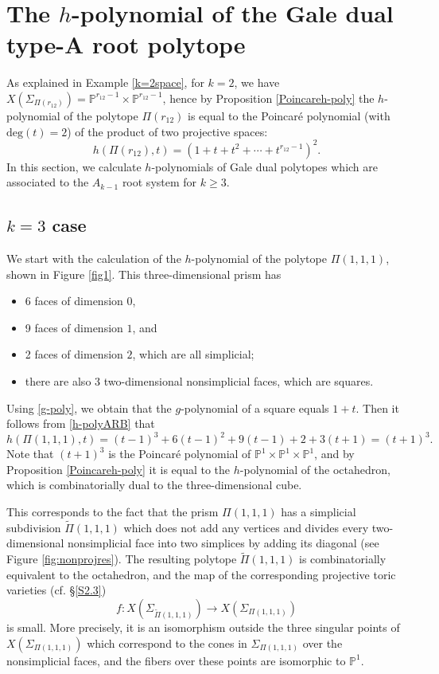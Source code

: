 \documentclass[11pt]{article}
\theoremstyle{definition}
\numberwithin{equation}{section}
\begin{document}
\section{The \texorpdfstring{$h$}{h}-polynomial of the Gale dual type-A root polytope}\label{sec:hpol}
As explained in Example \ref{k=2space}, for $k=2$, we have 
$X(\Sigma_{\Pi(r_{12})}) = \mathbb{P}^{r_{12}-1}\times\mathbb{P}^{r_{12}-1}$, 
hence by Proposition \ref{Poincareh-poly} the $h$-polynomial of the polytope 
$\Pi(r_{12})$ is equal to the Poincar\'e polynomial (with $\mathrm{deg}(t)=2$) 
of the product of two 
projective spaces:
$$h(\Pi(r_{12}), t) = (1+t+t^2+ \cdots +t^{r_{12}-1})^2.$$
In this section, we calculate $h$-polynomials of Gale dual polytopes which are associated to the $A_{k-1}$ root system for $k\geq3$.

\subsection{\texorpdfstring{$k=3$}{k=3} case}
We start with the calculation of the $h$-polynomial of the polytope 
$\Pi(1,1,1)$, shown in Figure \ref{fig1}. This three-dimensional prism 
has\begin{itemize}
	\item  6 faces of dimension $0$, 
	\item 9 faces of dimension $1$, and 
	\item 2 faces of dimension $2$, which are all simplicial;
	\item  there are also 3 two-dimensional nonsimplicial faces, which are 
	squares. 
\end{itemize}
Using  \eqref{g-poly}, we obtain that the $g$-polynomial of a square equals  
$1+t$. 
Then it follows from \eqref{h-polyARB} that
$$h(\Pi(1,1,1), t) = (t-1)^3+6(t-1)^2+9(t-1)+2+3(t+1) = (t+1)^3.$$
Note that $(t+1)^3$ is the Poincar\'e polynomial of 
$\mathbb{P}^1\times\mathbb{P}^1\times\mathbb{P}^1$, and by Proposition 
\ref{Poincareh-poly} it is equal to the $h$-polynomial of the octahedron, 
which is combinatorially dual to the three-dimensional cube. 

This corresponds to the fact that the prism $\Pi(1,1,1)$ has a simplicial 
subdivision $\widetilde{\Pi}(1,1,1)$ which does not add any vertices and 
divides every two-dimensional nonsimplicial face into two simplices by adding 
its diagonal (see Figure \ref{fig:nonprojres}). The resulting polytope 
$\widetilde{\Pi}(1,1,1)$ is combinatorially equivalent to the octahedron, and 
the map of the corresponding projective toric varieties (cf.  \S\ref{S2.3})
$$f: X(\Sigma_{\widetilde{\Pi}(1,1,1)})\to X(\Sigma_{{\Pi}(1,1,1)})$$
is small. More precisely, it is an isomorphism outside the three singular points of $X(\Sigma_{{\Pi}(1,1,1)})$ which correspond to the cones in $\Sigma_{\Pi(1,1,1)}$ over the nonsimplicial faces, and the fibers over these points are isomorphic to $\mathbb{P}^1$.
\end{document}
